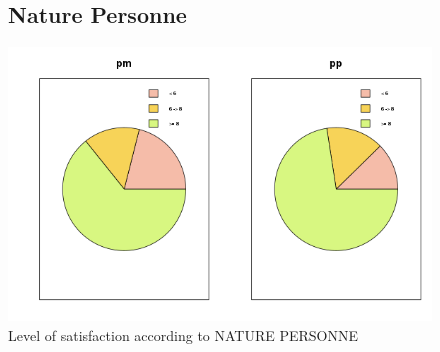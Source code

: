 \documentclass[a4paper, 11pt]{article}
\begin{document}
    \begin{figure}[!ht]
    \subsection{Nature Personne}
    	\centering
            \includegraphics[width = 10 cm]{Remi/Level_of_satisfaction_according_to_NATURE_PERSONNE2.png}
            \caption{Level of satisfaction according to NATURE PERSONNE}
            \label{fig:NATURE_PERSONNE2}
    \end{figure}
\end{document}
